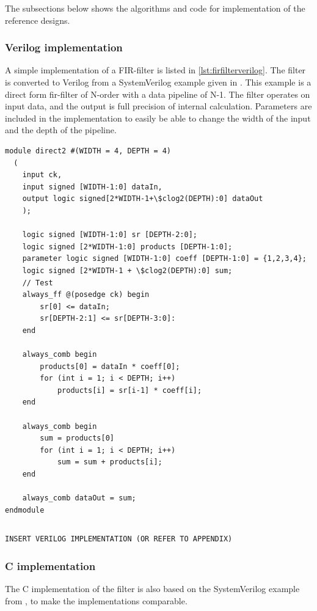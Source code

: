 The subsections below shows the algorithms and code for implementation of the reference designs.

\subsubsection{Verilog implementation}

A simple implementation of a FIR-filter is listed in \cref{lst:firfilterverilog}. The filter is converted to Verilog from a SystemVerilog example given in \cite{mehler2014digital}. This example is a direct form \gls{fir}-filter of N-order with a data pipeline of N-1. The filter operates on input data, and the output is full precision of internal calculation. Parameters are included in the implementation to easily be able to change the width of the input and the depth of the pipeline.

\lstset{language=SystemVerilog, style=Verilogstyle}
\begin{lstlisting}[caption={FIR-filter implemented in SystemVerilog. Example from \cite{mehler2014digital}},label=lst:firfiltersystemverilog]
module direct2 #(WIDTH = 4, DEPTH = 4)
  (
	input ck, 
	input signed [WIDTH-1:0] dataIn,
	output logic signed[2*WIDTH-1+\$clog2(DEPTH):0] dataOut
	);
	
	logic signed [WIDTH-1:0] sr [DEPTH-2:0];
	logic signed [2*WIDTH-1:0] products [DEPTH-1:0];
	parameter logic signed [WIDTH-1:0] coeff [DEPTH-1:0] = {1,2,3,4};
	logic signed [2*WIDTH-1 + \$clog2(DEPTH):0] sum;
	// Test
	always_ff @(posedge ck) begin
		sr[0] <= dataIn;
		sr[DEPTH-2:1] <= sr[DEPTH-3:0]:
	end
	
	always_comb begin
		products[0] = dataIn * coeff[0];
		for (int i = 1; i < DEPTH; i++)
			products[i] = sr[i-1] * coeff[i];
	end
	
	always_comb begin
		sum = products[0]
		for (int i = 1; i < DEPTH; i++)
			sum = sum + products[i];
	end
	
	always_comb dataOut = sum;
endmodule
\end{lstlisting}
\begin{lstlisting}[caption={FIR-filter implemented in Verilog},label=lst:firfilterverilog]

\end{lstlisting}
\begin{verbatim}
INSERT VERILOG IMPLEMENTATION (OR REFER TO APPENDIX)
\end{verbatim}
\subsubsection{C implementation}
The C implementation of the filter is also based on the SystemVerilog example from \cite{mehler2014digital}, to make the implementations comparable.

